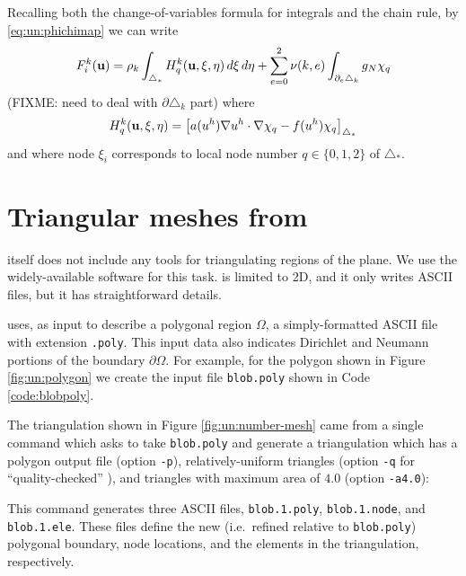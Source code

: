 Recalling both the change-of-variables formula for integrals and the chain rule, by \eqref{eq:un:phichimap} we can write
\begin{equation}
F_i^k(\mathbf{u}) = \rho_k \int_{\triangle_\ast} H_q^k(\mathbf{u},\xi,\eta)\,d\xi\,d\eta  + \sum_{e=0}^2 \nu(k,e) \int_{\partial_e \triangle_k} g_N \chi_q \label{eq:un:elementintegralreference}
\end{equation}
(FIXME: need to deal with $\partial\triangle_k$ part) where
\begin{equation}
H_q^k(\mathbf{u},\xi,\eta) = \left[a(u^h) \nabla u^h \cdot \nabla \chi_q - f(u^h) \chi_q\right]_{\triangle_\ast}  \label{eq:un:elementintegrand}
\end{equation}
and where node $\xi_i$ corresponds to local node number $q\in\{0,1,2\}$ of $\triangle_\ast$.


\section{Triangular meshes from \Triangle}

\PETSc itself does not include any tools for triangulating regions of the plane.  We use the widely-available \Triangle{} software \citep{Shewchuk1996} for this task.  \Triangle is limited to 2D, and it only writes ASCII files, but it has straightforward details.

\Triangle uses, as input to describe a polygonal region $\Omega$, a simply-formatted ASCII file with extension \texttt{.poly}.  This input data also indicates Dirichlet and Neumann portions of the boundary $\partial \Omega$.  For example, for the polygon shown in Figure \ref{fig:un:polygon} we create the input file \texttt{blob.poly} shown in Code \ref{code:blobpoly}.


The triangulation shown in Figure \ref{fig:un:number-mesh} came from a single command which asks \Triangle to take \texttt{blob.poly} and generate a triangulation which has a polygon output file (option \texttt{-p}), relatively-uniform triangles (option \texttt{-q} for ``quality-checked'' \citep{Shewchuk1996}), and triangles with maximum area of $4.0$ (option \texttt{-a4.0}):
This command generates three ASCII files, \texttt{blob.1.poly}, \texttt{blob.1.node}, and  \texttt{blob.1.ele}.  These files define the new (i.e.~refined relative to \texttt{blob.poly}) polygonal boundary, node locations, and the elements in the triangulation, respectively.

